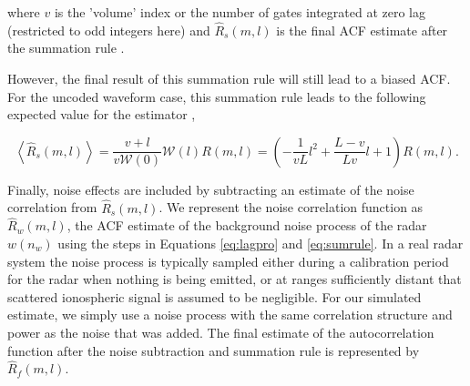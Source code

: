 \noindent where $v$ is the 'volume' index or the number of gates integrated at zero lag (restricted to odd integers here) and $\widehat{R}_s(m,l)$ is the final ACF estimate after the summation rule \cite{nygren1996}. 

However, the final result of this summation rule will still lead to a biased ACF. For the uncoded waveform case, this summation rule leads to the following expected value for the estimator \cite{nygren1996},

\begin{equation}
\label{eq:sumruleest}
\left\langle\widehat{R}_s(m,l) \right\rangle  =\frac{v+l}{v\mathcal{W}(0)}\mathcal{W}(l)R(m,l) =\left(-\frac{1}{vL}l^2+\frac{L-v}{Lv}l+1\right)   R(m,l).
\end{equation}





Finally, noise effects are included by subtracting an estimate of the noise correlation from $\widehat{R}_s(m,l)$.  We represent the noise correlation function as $\widehat{R}_w(m,l)$, the ACF estimate of the background noise process of the radar $w(n_w)$ using the steps in Equations \ref{eq:lagpro} and \ref{eq:sumrule}. In a real radar system the noise process is typically sampled either during a calibration period for the radar when nothing is being emitted, or at ranges sufficiently distant that scattered ionospheric signal is assumed to be negligible. For our simulated estimate, we simply use a noise process with the same correlation structure and power as the noise that was added. The final estimate of the autocorrelation function after the noise subtraction and summation rule is represented by $\widehat{R}_f(m,l)$.

